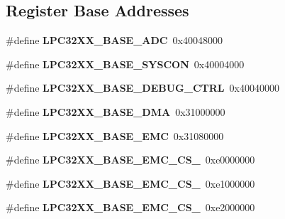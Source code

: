 \subsection*{Register Base Addresses}
\begin{DoxyCompactItemize}
\item 
\mbox{\label{group__lpc32xx__reg_ga676a482aac02ed77535cb761d4c212d7}} 
\#define {\bfseries L\+P\+C32\+X\+X\+\_\+\+B\+A\+S\+E\+\_\+\+A\+DC}~0x40048000
\item 
\mbox{\label{group__lpc32xx__reg_ga2541dbf34a7df36ee134ec1b862259b9}} 
\#define {\bfseries L\+P\+C32\+X\+X\+\_\+\+B\+A\+S\+E\+\_\+\+S\+Y\+S\+C\+ON}~0x40004000
\item 
\mbox{\label{group__lpc32xx__reg_ga966a663b7535ba41c377d0bcac45a828}} 
\#define {\bfseries L\+P\+C32\+X\+X\+\_\+\+B\+A\+S\+E\+\_\+\+D\+E\+B\+U\+G\+\_\+\+C\+T\+RL}~0x40040000
\item 
\mbox{\label{group__lpc32xx__reg_gaf13cbb64ff317023bd9bddcdcf049017}} 
\#define {\bfseries L\+P\+C32\+X\+X\+\_\+\+B\+A\+S\+E\+\_\+\+D\+MA}~0x31000000
\item 
\mbox{\label{group__lpc32xx__reg_ga749c9c770d150538e99021bb2975c6c9}} 
\#define {\bfseries L\+P\+C32\+X\+X\+\_\+\+B\+A\+S\+E\+\_\+\+E\+MC}~0x31080000
\item 
\mbox{\label{group__lpc32xx__reg_gadd40722b313aaf2fab88339a6f9d7a2c}} 
\#define {\bfseries L\+P\+C32\+X\+X\+\_\+\+B\+A\+S\+E\+\_\+\+E\+M\+C\+\_\+\+C\+S\+\_}~0xe0000000
\item 
\mbox{\label{group__lpc32xx__reg_ga91b911ec542e154dc3729eb1b0ab9faa}} 
\#define {\bfseries L\+P\+C32\+X\+X\+\_\+\+B\+A\+S\+E\+\_\+\+E\+M\+C\+\_\+\+C\+S\+\_}~0xe1000000
\item 
\mbox{\label{group__lpc32xx__reg_ga9ec17ac0b46af208b7ca7c9723fc42f0}} 
\#define {\bfseries L\+P\+C32\+X\+X\+\_\+\+B\+A\+S\+E\+\_\+\+E\+M\+C\+\_\+\+C\+S\+\_}~0xe2000000
\item 
\mbox{\label{group__lpc32xx__reg_gaf871cd36d5ac39997f625dff3a2c5892}} 

\end{DoxyCompactItemize}
